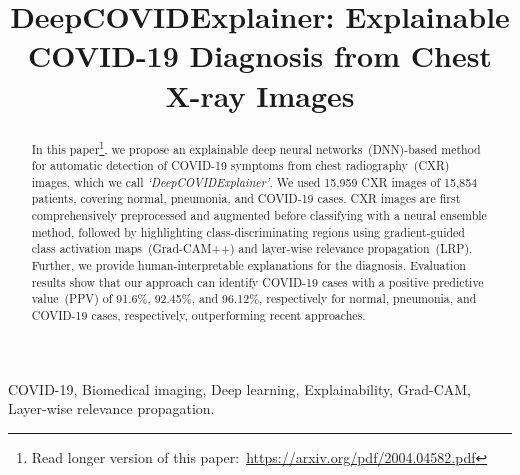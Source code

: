 \documentclass[conference]{IEEEtran}
\begin{document}

\title{DeepCOVIDExplainer: Explainable COVID-19 Diagnosis from Chest X-ray Images}

\author{
}

\maketitle

\begin{abstract}
    In this paper\footnote{Read longer version of this paper:~\url{https://arxiv.org/pdf/2004.04582.pdf}}, we propose an explainable deep neural networks~(DNN)-based method for automatic detection of COVID-19 symptoms from chest radiography~(CXR) images, which we call \emph{`DeepCOVIDExplainer'}. We used 15,959 CXR images of 15,854 patients, covering normal, pneumonia, and COVID-19 cases. CXR images are first comprehensively preprocessed and augmented before classifying with a neural ensemble method, followed by highlighting class-discriminating regions using gradient-guided class activation maps~(Grad-CAM++) and layer-wise relevance propagation~(LRP). Further, we provide human-interpretable explanations for the diagnosis. Evaluation results show that our approach can identify COVID-19 cases 
    with a positive predictive value~(PPV) of 91.6\%, 92.45\%, and 96.12\%, respectively for normal, pneumonia, and COVID-19 cases, respectively, 
    outperforming recent approaches. %
\end{abstract}
\begin{IEEEkeywords} COVID-19, Biomedical imaging, Deep learning, Explainability, Grad-CAM, Layer-wise relevance propagation.\end{IEEEkeywords}
\end{document}
